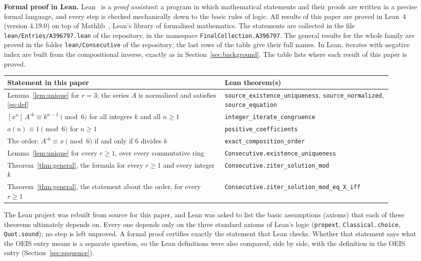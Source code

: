 \documentclass[11pt,a4paper]{article}
\theoremstyle{definition}
\theoremstyle{remark}
\newcommand{\coeff}[2]{[x^{#1}]\,#2}
\newcommand{\para}[1]{\par\medskip\noindent\textbf{#1}\enspace}
\begin{document}
\para{Formal proof in Lean.}
Lean~\cite{lean} is a \emph{proof assistant}: a program in which mathematical statements and their proofs are written
in a precise formal language, and every step is checked mechanically down to the basic rules of logic. All results of
this paper are proved in Lean~4 (version 4.19.0) on top of Mathlib~\cite{mathlib}, Lean's library of formalized
mathematics. The statements are collected in the file \texttt{lean/Entries/A396797.lean} of the repository,
in the namespace \texttt{FinalCollection.A396797}. The general results for the whole family are proved in the folder \texttt{lean/Consecutive} of the
repository; the last rows of the table give their full names. In Lean, iterates with negative index are built from the
compositional inverse, exactly as in Section~\ref{sec:background}.
The table lists where each result of this paper is proved.
\begin{center}\small\renewcommand{\arraystretch}{1.25}
\begin{tabular}{>{\raggedright\arraybackslash}p{0.52\linewidth}>{\raggedright\arraybackslash}p{0.4\linewidth}}
\toprule
Statement in this paper & Lean theorem(s)\\
\midrule
Lemma~\ref{lem:unique} for $r=3$; the series $A$ is normalized and satisfies \eqref{eq:def} & \texttt{source\_\allowbreak{}existence\_\allowbreak{}uniqueness}, \texttt{source\_\allowbreak{}normalized}, \texttt{source\_\allowbreak{}equation} \\
$\coeff{n}{A^{\circ k}}\equiv k^{n-1}\pmod6$ for all integers $k$ and all $n\ge1$ & \texttt{integer\_\allowbreak{}iterate\_\allowbreak{}congruence} \\
$a(n)\equiv1\pmod6$ for $n\ge1$ & \texttt{positive\_\allowbreak{}coefficients} \\
The order: $A^{\circ k}\equiv x\pmod6$ if and only if $6$ divides $k$ & \texttt{exact\_\allowbreak{}composition\_\allowbreak{}order} \\
Lemma~\ref{lem:unique} for every $r\ge1$, over every commutative ring & \texttt{Consecutive.existence\_\allowbreak{}uniqueness} \\
Theorem~\ref{thm:general}, the formula for every $r\ge1$ and every integer $k$ & \texttt{Consecutive.ziter\_\allowbreak{}solution\_\allowbreak{}mod} \\
Theorem~\ref{thm:general}, the statement about the order, for every $r\ge1$ & \texttt{Consecutive.ziter\_\allowbreak{}solution\_\allowbreak{}mod\_\allowbreak{}eq\_\allowbreak{}X\_\allowbreak{}iff} \\
\bottomrule
\end{tabular}
\end{center}
The Lean project was rebuilt from source for this paper, and Lean was asked to list the basic assumptions (axioms)
that each of these theorems ultimately depends on. Every one depends only on the three standard axioms of Lean's logic
(\texttt{propext}, \texttt{Classical.choice}, \texttt{Quot.sound}); no step is left unproved. A formal proof certifies
exactly the statement that Lean checks. Whether that statement says what the OEIS entry means is a separate question,
so the Lean definitions were also compared, side by side, with the definition in the OEIS entry
(Section~\ref{sec:sequence}).
\end{document}
